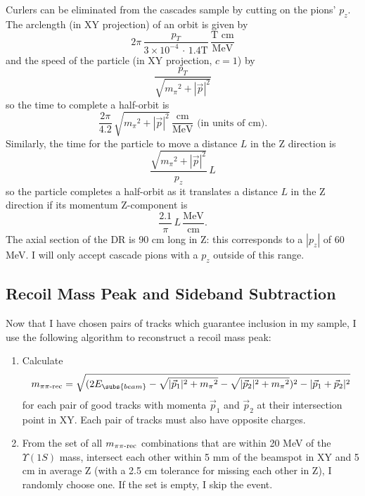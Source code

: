 Curlers can be eliminated from the cascades sample by cutting on the
pions' $p_z$.  The arclength (in XY projection) of an orbit is given
by
\begin{equation}
  2\pi \, \frac{p_T}{3\times 10^{-4} \, \cdot \, 1.4 \mbox{T}} \,
  \frac{\mbox{T cm}}{\mbox{MeV}}
\end{equation}
and the speed of the particle (in XY projection, $c=1$) by
\begin{equation}
  \frac{p_T}{\sqrt{{m_\pi}^2 + |\vec{p}|^2}}
\end{equation}
so the time to complete a half-orbit is
\begin{equation}
  \frac{2\pi}{4.2} \, \sqrt{{m_\pi}^2 + |\vec{p}|^2} \,
  \frac{\mbox{cm}}{\mbox{MeV}}\mbox{ (in units of cm).}
\end{equation}
Similarly, the time for the particle to move a distance $L$ in the Z
direction is
\begin{equation}
  \frac{\sqrt{{m_\pi}^2 + |\vec{p}|^2}}{p_z} \, L
\end{equation}
so the particle completes a half-orbit as it translates a distance $L$
in the Z direction if its momentum Z-component is
\begin{equation}
  \frac{2.1}{\pi} \, L \, \frac{\mbox{MeV}}{\mbox{cm}} \mbox{.}
\end{equation}
The axial section of the DR is 90 cm long in Z: this corresponds to a
$|p_z|$ of 60 MeV.  I will only accept cascade pions with a $p_z$
outside of this range.

\subsection{Recoil Mass Peak and Sideband Subtraction}

Now that I have chosen pairs of tracks which guarantee inclusion in my
sample, I use the following algorithm to reconstruct a recoil mass
peak:
\begin{enumerate}
  \item Calculate
    \begin{equation}
      m_{\pi\pi \mbox{\scriptsize -rec}} = \sqrt{(2
        E_\subs{beam} - \sqrt{|\vec{p}_1|^2 + {m_\pi}^2} -
	  \sqrt{|\vec{p}_2|^2 + {m_\pi}^2})^2 - |\vec{p}_1 +
	      \vec{p}_2|^2}
    \end{equation}
  for each pair of good tracks with momenta $\vec{p}_1$ and
  $\vec{p}_2$ at their intersection point in XY.  Each pair of tracks
  must also have opposite charges.

  \item From the set of all $m_{\pi\pi \mbox{\scriptsize -rec}}$
  combinations that are within 20 MeV of the $\Upsilon(1S)$ mass,
  intersect each other within 5 mm of the beamspot in XY and 5 cm in
  average Z (with a 2.5 cm tolerance for missing each other in Z),
  I randomly choose one.  If the set is empty, I skip the event.
\end{enumerate}

